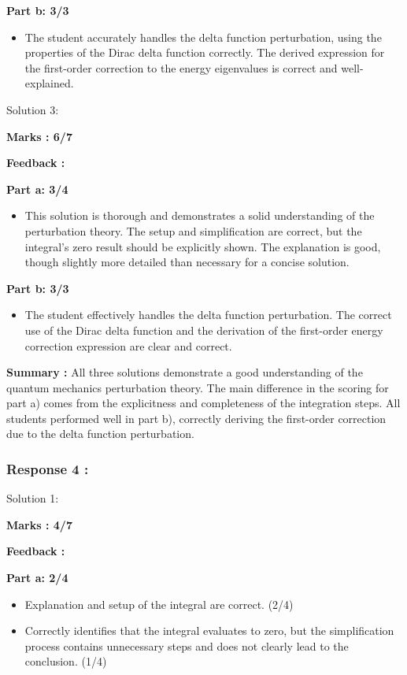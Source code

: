 \documentclass[a4paper,11pt]{article}
\begin{document}
\textbf{Part b: 3/3}
\begin{itemize}
    \item The student accurately handles the delta function perturbation, using the properties of the Dirac delta function correctly. The derived expression for the first-order correction to the energy eigenvalues is correct and well-explained.
\end{itemize}



Solution 3:


\textbf{ Marks : 6/7}

\textbf{Feedback :}

\textbf{Part a: 3/4}

\begin{itemize}
    \item This solution is thorough and demonstrates a solid understanding of the perturbation theory. The setup and simplification are correct, but the integral's zero result should be explicitly shown. The explanation is good, though slightly more detailed than necessary for a concise solution.
\end{itemize}

\textbf{Part b: 3/3}
\begin{itemize}
    \item The student effectively handles the delta function perturbation. The correct use of the Dirac delta function and the derivation of the first-order energy correction expression are clear and correct.
\end{itemize}

\textbf{Summary :}
All three solutions demonstrate a good understanding of the quantum mechanics perturbation theory. The main difference in the scoring for part a) comes from the explicitness and completeness of the integration steps. All students performed well in part b), correctly deriving the first-order correction due to the delta function perturbation.



\subsubsection*{Response 4 :}

Solution 1:


\textbf{ Marks : 4/7}

\textbf{Feedback :}

\textbf{Part a: 2/4}

\begin{itemize}
    \item Explanation and setup of the integral are correct. (2/4)
    \item Correctly identifies that the integral evaluates to zero, but the simplification process contains unnecessary steps and does not clearly lead to the conclusion. (1/4)
\end{itemize}
\end{document}
